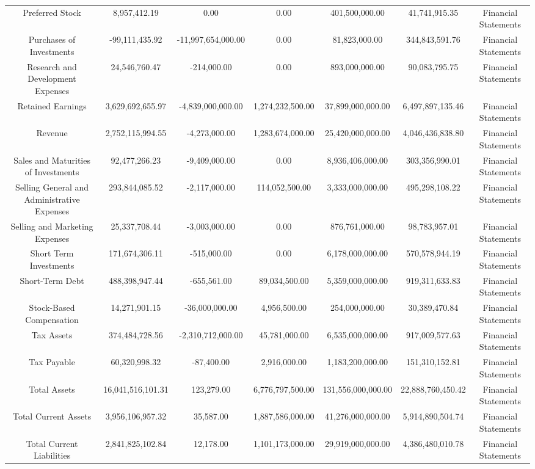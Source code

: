 \begin{longtable}{ccccccc}
Preferred Stock & 8,957,412.19 & 0.00 & 0.00 & 401,500,000.00 & 41,741,915.35 & Financial Statements \\
Purchases of Investments & -99,111,435.92 & -11,997,654,000.00 & 0.00 & 81,823,000.00 & 344,843,591.76 & Financial Statements \\
Research and Development Expenses & 24,546,760.47 & -214,000.00 & 0.00 & 893,000,000.00 & 90,083,795.75 & Financial Statements \\
Retained Earnings & 3,629,692,655.97 & -4,839,000,000.00 & 1,274,232,500.00 & 37,899,000,000.00 & 6,497,897,135.46 & Financial Statements \\
Revenue & 2,752,115,994.55 & -4,273,000.00 & 1,283,674,000.00 & 25,420,000,000.00 & 4,046,436,838.80 & Financial Statements \\
Sales and Maturities of Investments & 92,477,266.23 & -9,409,000.00 & 0.00 & 8,936,406,000.00 & 303,356,990.01 & Financial Statements \\
Selling General and Administrative Expenses & 293,844,085.52 & -2,117,000.00 & 114,052,500.00 & 3,333,000,000.00 & 495,298,108.22 & Financial Statements \\
Selling and Marketing Expenses & 25,337,708.44 & -3,003,000.00 & 0.00 & 876,761,000.00 & 98,783,957.01 & Financial Statements \\
Short Term Investments & 171,674,306.11 & -515,000.00 & 0.00 & 6,178,000,000.00 & 570,578,944.19 & Financial Statements \\
Short-Term Debt & 488,398,947.44 & -655,561.00 & 89,034,500.00 & 5,359,000,000.00 & 919,311,633.83 & Financial Statements \\
Stock-Based Compensation & 14,271,901.15 & -36,000,000.00 & 4,956,500.00 & 254,000,000.00 & 30,389,470.84 & Financial Statements \\
Tax Assets & 374,484,728.56 & -2,310,712,000.00 & 45,781,000.00 & 6,535,000,000.00 & 917,009,577.63 & Financial Statements \\
Tax Payable & 60,320,998.32 & -87,400.00 & 2,916,000.00 & 1,183,200,000.00 & 151,310,152.81 & Financial Statements \\
Total Assets & 16,041,516,101.31 & 123,279.00 & 6,776,797,500.00 & 131,556,000,000.00 & 22,888,760,450.42 & Financial Statements \\
Total Current Assets & 3,956,106,957.32 & 35,587.00 & 1,887,586,000.00 & 41,276,000,000.00 & 5,914,890,504.74 & Financial Statements \\
Total Current Liabilities & 2,841,825,102.84 & 12,178.00 & 1,101,173,000.00 & 29,919,000,000.00 & 4,386,480,010.78 & Financial Statements \\

\end{longtable}
